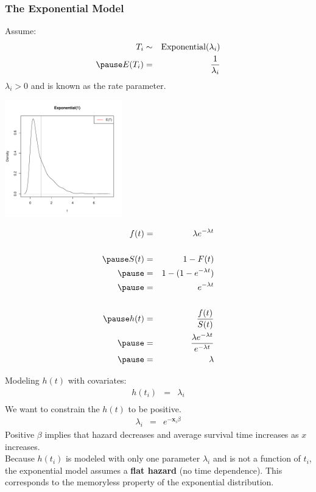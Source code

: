 \documentclass{beamer}
\begin{document}
\begin{frame}
\frametitle{The Exponential Model}
\pause
Assume:
\begin{eqnarray*}
T_i &\sim& \mathrm{Exponential}(\lambda_i)\\
\pause
E(T_i) &=& \frac{1}{\lambda_i}
\end{eqnarray*}
\pause
$\lambda_i > 0$ and is known as the rate parameter.
\begin{center}
\includegraphics[width = 2in, height = 2in]{survival_present-expo1.pdf}
\end{center}

\end{frame}

\begin{frame}
\begin{eqnarray*}
f(t) &=& \lambda e^{-\lambda t}\\\\
\pause
S(t) &=& 1 - F(t)\\
\pause
&=& 1 - (1 - e^{-\lambda t})\\
\pause
&=& e^{-\lambda t}\\\\
\pause
h(t) &=& \frac{f(t)}{S(t)}\\
\pause
&=& \frac{\lambda e^{-\lambda t}}{e^{-\lambda t}}\\
\pause
&=& \lambda
\end{eqnarray*}
\end{frame}

\begin{frame}
Modeling $h(t)$ with covariates:
\pause
\begin{eqnarray*}
h(t_i) &=& \lambda_i\\
\end{eqnarray*}
\pause
We want to constrain the $h(t)$ to be positive.
\pause
\begin{eqnarray*}
\lambda_i &=& e^{-\mathbf{x}_i \beta}
\end{eqnarray*}
\pause
Positive $\beta$ implies that hazard decreases and average survival
time increases as $x$ increases.\\
\bigskip
\pause
Because $h(t_i)$ is modeled with only one parameter $\lambda_i$ and is
not a function of $t_i$, the
exponential model assumes a \textbf{flat hazard} (no time dependence). \pause This
corresponds to the memoryless property of the exponential distribution.
\end{frame}
\end{document}
